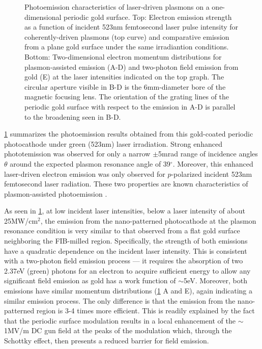 \begin{figure}
  \centering
  
  \caption[Photoemission characteristics of laser-driven plasmons on a one-dimensional periodic gold surface]{
    Photoemission characteristics of laser-driven plasmons on a one-dimensional periodic gold surface.
    Top: Electron emission strength as a function of incident 523nm femtosecond laser pulse intensity for coherently-driven plasmons (top curve)
      and comparative emission from a plane gold surface under the same irradiantion conditions.
    Bottom: Two-dimensional electron momentum distributions for plasmon-assisted emission (A-D) and two-photon field emission from gold (E) at the laser intensities indicated on the top graph.
    The circular aperture visible in B-D is the 6mm-diameter bore of the magnetic focusing lens.
    The orientation of the grating lines of the periodic gold surface with respect to the emission in A-D is parallel to the broadening seen in B-D.
  }
  \label{fig:pape}
\end{figure}

\ref{fig:pape} summarizes the photoemission results obtained from this gold-coated periodic photocathode under green (523nm) laser irradiation.
Strong enhanced phototemission was observed for only a narrow $\pm$5mrad range of incidence angles $\theta$ around the expected plasmon resonance angle of 39$^{\circ}$.
Moreover, this enhanced laser-driven electron emission was only observed for $p$-polarized incident 523nm femtosecond laser radiation.
These two properties are known characteristics of plasmon-assisted photoemission \cite{kupersztych_ponderomotive_2001,kupersztych_anomalous_2005,li_surface_2013}.

As seen in \ref{fig:pape}, at low incident laser intensities, below a laser intensity of about 25MW/cm$^2$, the emission from the nano-patterned photocathode at the plasmon resonance condition is very similar to that observed from a flat gold surface neighboring the FIB-milled region.
Specifically, the strength of both emissions have a quadratic dependence on the incident laser intensity.
This is consistent with a two-photon field emission process --- it requires the absorption of two 2.37eV (green) photons for an electron to acquire sufficient energy to allow any significant field emission as gold has a work function of $\sim$5eV.
Moreover, both emissions have similar momentum distributions (\ref{fig:pape} A and E), again indicating a similar emission process.
The only difference is that the emission from the nano-patterned region is 3-4 times more efficient.
This is readily explained by the fact that the periodic surface modulation results in a local enhancement of the $\sim$1MV/m DC gun field at the peaks of the modulation which, through the Schottky effect, then presents a reduced barrier for field emission.


